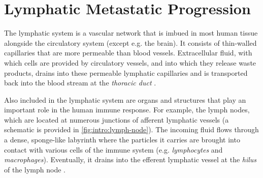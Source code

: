 \documentclass[\relativeRoot/main.tex]{subfiles}
\begin{document}
\section{Lymphatic Metastatic Progression}
\label{sec:intro:lymph_spread}

The lymphatic system is a vascular network that is imbued in most human tissue alongside the circulatory system (except e.g. the brain). It consists of thin-walled capillaries that are more permeable than blood vessels. Extracellular fluid, with which cells are provided by circulatory vessels, and into which they release waste products, drains into these permeable lymphatic capillaries and is transported back into the blood stream at the \emph{thoracic duct} \cite{willard-mack_normal_2006,wissmann_pathways_2006,oliver_rediscovery_2002}.

Also included in the lymphatic system are organs and structures that play an important role in the human immune response. For example, the lymph nodes, which are located at numerous junctions of afferent lymphatic vessels (a schematic is provided in \cref{fig:intro:lymph-node}). The incoming fluid flows through a dense, sponge-like labyrinth where the particles it carries are brought into contact with various cells of the immune system (e.g. \emph{lymphocytes} and \emph{macrophages}). Eventually, it drains into the efferent lymphatic vessel at the \emph{hilus} of the lymph node \cite{willard-mack_normal_2006,ohtani_structure_2008}.
\end{document}
